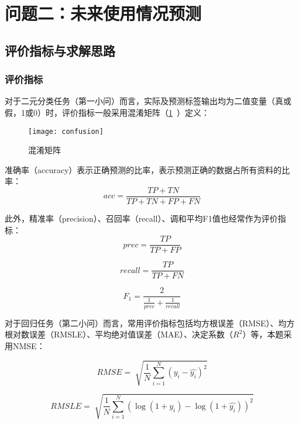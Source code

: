 \documentclass[withoutpreface,bwprint]{cumcmthesis}
\begin{document}
\newpage
\section{问题二：未来使用情况预测}

\subsection{评价指标与求解思路}

\subsubsection{评价指标}
对于二元分类任务（第一小问）而言，实际及预测标签输出均为二值变量（真或假，1或0）时，评价指标一般采用混淆矩阵（\cref{fig:confusion}~）定义：

\begin{figure}[!htbp]
    \centering
    \texttt{[image: confusion]}
    \caption{混淆矩阵}
    \label{fig:confusion}
\end{figure}

准确率（accuracy）表示正确预测的比率，表示预测正确的数据占所有资料的比率：
\begin{equation}
    acc = \frac{TP+TN}{TP+TN+FP+FN}
    \label{eq:acc}
\end{equation}

此外，精准率（precision）、召回率（recall）、调和平均F1值也经常作为评价指标：
\begin{equation}
    prec = \frac{TP}{TP+FP}
    \label{eq:prec}
\end{equation}

\begin{equation}
    recall = \frac{TP}{TP+FN}
    \label{eq:recall}
\end{equation}

\begin{equation}
    F_1 = \frac{2}{\frac{1}{prec}+\frac{1}{recall}}
    \label{eq:f1}
\end{equation}

对于回归任务（第二小问）而言，常用评价指标包括均方根误差（RMSE）、均方根对数误差（RMSLE）、平均绝对值误差（MAE）、决定系数（$R^2$）等，本题采用NMSE：

\begin{equation}
    RMSE = \sqrt[]{
        \frac{1}{N} \sum_{i=1}^{N} (y_i-\hat{y_i})^2
    }
    \label{eq:rmse}
\end{equation}

\begin{equation}
    RMSLE = \sqrt[]{
    \frac{1}{N} \sum_{i=1}^{N} (\log(1+y_i)-\log(1+\hat{y_i}))^2
    }
    \label{eq:rmsle}
\end{equation}
\end{document}
